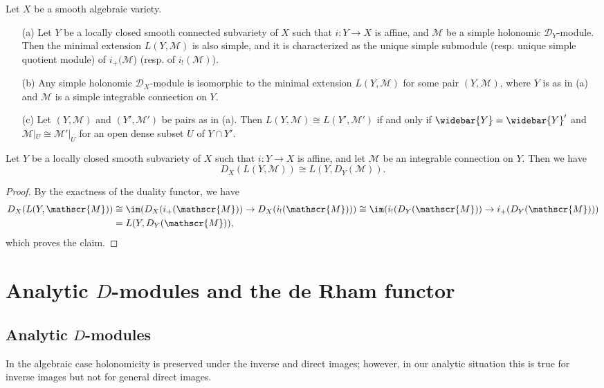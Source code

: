 \begin{theorem}\label{D-module holonomic simple module char by minimal extension}
Let $X$ be a smooth algebraic variety.
\begin{enumerate}
    \item[(a)] Let $Y$ be a locally closed smooth connected subvariety of $X$ such that $i:Y\to X$ is affine, and $\mathscr{M}$ be a simple holonomic $\mathscr{D}_Y$-module. Then the minimal extension $L(Y,\mathscr{M})$ is also simple, and it is characterized as the unique simple submodule (resp. unique simple quotient module) of $i_+(\mathscr{M}$) (resp. of $i_!(\mathscr{M})$).
    \item[(b)] Any simple holonomic $\mathscr{D}_X$-module is isomorphic to the minimal extension $L(Y,\mathscr{M})$ for some pair $(Y,\mathscr{M})$, where $Y$ is as in (a) and $\mathscr{M}$ is a simple integrable connection on $Y$.
    \item[(c)] Let $(Y,\mathscr{M})$ and $(Y',\mathscr{M}')$ be pairs as in (a). Then $L(Y,\mathscr{M})\cong L(Y',\mathscr{M}')$ if and only if $\widebar{Y}=\widebar{Y}'$ and $\mathscr{M}|_U\cong\mathscr{M}'|_{U}$ for an open dense subset $U$ of $Y\cap Y'$.
\end{enumerate}
\end{theorem}

\begin{proposition}\label{D-module holonomic minimal extension commutes with dual}
Let $Y$ be a locally closed smooth subvariety of $X$ such that $i:Y\to X$ is affine, and let $\mathscr{M}$ be an integrable connection on $Y$. Then we have
\[D_X(L(Y,\mathscr{M}))\cong L(Y,D_Y(\mathscr{M})).\]
\end{proposition}
\begin{proof}
By the exactness of the duality functor, we have
\begin{align*}
D_X(L(Y,\mathscr{M}))&\cong\im(D_X(i_+(\mathscr{M}))\to D_X(i_!(\mathscr{M})))\cong\im(i_!(D_Y(\mathscr{M}))\to i_+(D_Y(\mathscr{M})))\\
&=L(Y,D_Y(\mathscr{M})),
\end{align*}
which proves the claim.
\end{proof}

\section{Analytic \texorpdfstring{$D$}{D}-modules and the de Rham functor}
\subsection{Analytic \texorpdfstring{$D$}{D}-modules}
In the algebraic case holonomicity is preserved under the inverse and direct images; however, in our analytic situation this is true for inverse images but not for general direct images.

